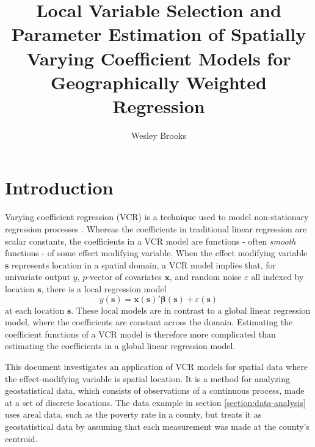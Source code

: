 \documentclass[authoryear, review, 11pt]{elsarticle}
\title{Local Variable Selection and Parameter Estimation of Spatially Varying Coefficient Models for Geographically Weighted Regression}
\author{Wesley Brooks}
\date{}                                           %
\begin{document}
\maketitle




\section{Introduction}
	Varying coefficient regression (VCR) is a technique used to model non-stationary regression processes \citep{Hastie:1993a}. Whereas the coefficients in traditional linear regression are scalar constants, the coefficients in a VCR model are functions - often \emph{smooth} functions - of some effect modifying variable. When the effect modifying variable $\bm{s}$ represents location in a spatial domain, a VCR model implies that, for univariate output $y$, $p$-vector of covariates $\bm{x}$, and random noise $\varepsilon$ all indexed by location $\bm{s}$, there is a local regression model
\[
y(\bm{s}) = \bm{x}(\bm{s})' \bm{\beta}(\bm{s}) + \varepsilon(\bm{s})
\]
at each location $\bm{s}$. These local models are in contrast to a global linear regression model, where the coefficients are constant across the domain. Estimating the coefficient functions of a VCR model is therefore more complicated than estimating the coefficients in a global linear regression model.
	
	This document investigates an application of VCR models for spatial data where the effect-modifying variable is spatial location. It is a method for analyzing geostatistical data, which consists of observations of a continuous process, made at a set of discrete locations. The data example in section \ref{section:data-analysis} uses areal data, such as the poverty rate in a county, but treats it as geostatistical data by assuming that each measurement was made at the county's centroid.
	
\end{document}
